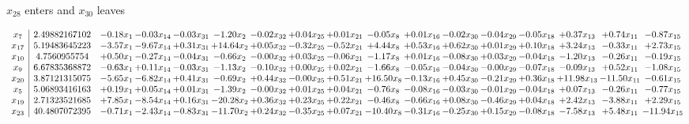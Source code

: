 \documentclass[9pt]{article}
\begin{document}
 $ x_{28} $ enters and $ x_{30} $ leaves 

 \[\begin{array}{c| c c@{\hskip 2pt} c@{\hskip 2pt} c@{\hskip 2pt} c@{\hskip 2pt} c@{\hskip 2pt} c@{\hskip 2pt} c@{\hskip 2pt} c@{\hskip 2pt} c@{\hskip 2pt} c@{\hskip 2pt} c@{\hskip 2pt} c@{\hskip 2pt} c@{\hskip 2pt} c@{\hskip 2pt} c@{\hskip 2pt} }
 x_{7}   &  2.49882167102 & -0.18 x_{1} & -0.03 x_{14} & -0.03 x_{31} & -1.20 x_{2} & -0.02 x_{32} & +  0.04 x_{25} & +  0.01 x_{21} & -0.05 x_{8} & +  0.01 x_{16} & -0.02 x_{30} & -0.04 x_{29} & -0.05 x_{18} & +  0.37 x_{13} & +  0.74 x_{11} & -0.87 x_{15}\\
 x_{17}   &  5.19483645223 & -3.57 x_{1} & -9.67 x_{14} & +  0.31 x_{31} & + 14.64 x_{2} & +  0.05 x_{32} & -0.32 x_{25} & -0.52 x_{21} & +  4.44 x_{8} & +  0.53 x_{16} & +  0.62 x_{30} & +  0.01 x_{29} & +  0.10 x_{18} & +  3.24 x_{13} & -0.33 x_{11} & +  2.73 x_{15}\\
 x_{10}   &  4.7560955754 & +  0.50 x_{1} & -0.27 x_{14} & -0.04 x_{31} & -0.66 x_{2} & -0.00 x_{32} & +  0.03 x_{25} & -0.06 x_{21} & -1.17 x_{8} & +  0.01 x_{16} & -0.08 x_{30} & +  0.03 x_{29} & -0.04 x_{18} & -1.20 x_{13} & -0.26 x_{11} & -0.19 x_{15}\\
 x_{9}   &  6.67835368872 & -0.63 x_{1} & +  0.11 x_{14} & -0.03 x_{31} & -1.13 x_{2} & -0.10 x_{32} & +  0.00 x_{25} & +  0.02 x_{21} & -1.66 x_{8} & -0.05 x_{16} & -0.04 x_{30} & -0.00 x_{29} & -0.07 x_{18} & -0.09 x_{13} & +  0.52 x_{11} & -1.08 x_{15}\\
 x_{20}   &  3.87121315075 & -5.65 x_{1} & -6.82 x_{14} & +  0.41 x_{31} & -0.69 x_{2} & +  0.44 x_{32} & -0.00 x_{25} & +  0.51 x_{21} & + 16.50 x_{8} & -0.13 x_{16} & +  0.45 x_{30} & -0.21 x_{29} & +  0.36 x_{18} & + 11.98 x_{13} & -11.50 x_{11} & -0.61 x_{15}\\
 x_{5}   &  5.06893416163 & +  0.19 x_{1} & +  0.05 x_{14} & +  0.01 x_{31} & -1.39 x_{2} & -0.00 x_{32} & +  0.01 x_{25} & +  0.04 x_{21} & -0.76 x_{8} & -0.08 x_{16} & -0.03 x_{30} & -0.01 x_{29} & -0.04 x_{18} & +  0.07 x_{13} & -0.26 x_{11} & -0.77 x_{15}\\
 x_{19}   &  2.71323521685 & +  7.85 x_{1} & -8.54 x_{14} & +  0.16 x_{31} & -20.28 x_{2} & +  0.36 x_{32} & +  0.23 x_{25} & +  0.22 x_{21} & -0.46 x_{8} & -0.66 x_{16} & +  0.08 x_{30} & -0.46 x_{29} & +  0.04 x_{18} & +  2.42 x_{13} & -3.88 x_{11} & +  2.29 x_{15}\\
 x_{23}   &  40.4807072395 & -0.71 x_{1} & -2.43 x_{14} & -0.83 x_{31} & -11.70 x_{2} & +  0.24 x_{32} & -0.35 x_{25} & +  0.07 x_{21} & -10.40 x_{8} & -0.31 x_{16} & -0.25 x_{30} & +  0.15 x_{29} & -0.08 x_{18} & -7.58 x_{13} & +  5.48 x_{11} & -11.94 x_{15}\\

\end{array}\]
\end{document}
